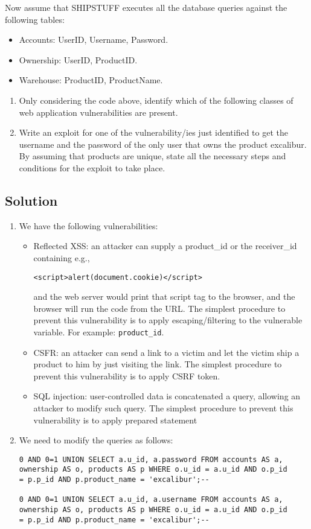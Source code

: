 Now assume that SHIPSTUFF executes all the database queries against the following tables:
\begin{itemize}
    \item Accounts: UserID, Username, Password. 
    \item Ownership: UserID, ProductID. 
    \item Warehouse: ProductID, ProductName.
\end{itemize}
\begin{enumerate}
    \item Only considering the code above, identify which of the following classes of web application vulnerabilities are present. 
    \item Write an exploit for one of the vulnerability/ies just identified to get the username and the password of the only user that owns the product excalibur.
    By assuming that products are unique, state all the necessary steps and conditions for the exploit to take place.
\end{enumerate}

\subsection*{Solution}
\begin{enumerate}
    \item We have the following vulnerabilities: 
        \begin{itemize}
            \item Reflected XSS: an attacker can supply a product\_id or the receiver\_id containing e.g.,
\begin{verbatim}
<script>alert(document.cookie)</script>
\end{verbatim}
                and the web server would print that script tag to the browser, and the browser will run the code from the URL.
                The simplest procedure to prevent this vulnerability is to apply escaping/filtering to the vulnerable variable. For example: \texttt{product\_id}. 
            \item CSFR: an attacker can send a link to a victim and let the victim ship a product to him by just visiting the link. 
                The simplest procedure to prevent this vulnerability is to apply CSRF token.
            \item SQL injection: user-controlled data is concatenated a query, allowing an attacker to modify such query.
                The simplest procedure to prevent this vulnerability is to apply prepared statement
        \end{itemize}
    \item We need to modify the queries as follows: 
\begin{verbatim}
0 AND 0=1 UNION SELECT a.u_id, a.password FROM accounts AS a,
ownership AS o, products AS p WHERE o.u_id = a.u_id AND o.p_id 
= p.p_id AND p.product_name = 'excalibur';--

0 AND 0=1 UNION SELECT a.u_id, a.username FROM accounts AS a,
ownership AS o, products AS p WHERE o.u_id = a.u_id AND o.p_id 
= p.p_id AND p.product_name = 'excalibur';--
\end{verbatim}
\end{enumerate}
